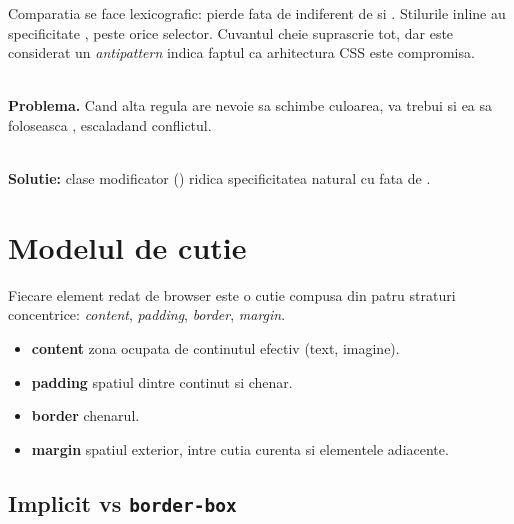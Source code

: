 Comparatia se face lexicografic:  pierde fata de  indiferent de  si . Stilurile inline au specificitate , peste orice selector. Cuvantul cheie  suprascrie tot, dar este considerat un \emph{antipattern} \textendash{} indica faptul ca arhitectura CSS este compromisa.

\begin{dano}
\\
\textbf{Problema.} Cand alta regula are nevoie sa schimbe culoarea, va trebui si ea sa foloseasca , escaladand conflictul.
\end{dano}

\begin{dado}
\\
\textbf{Solutie:} clase modificator () ridica specificitatea natural cu  fata de .
\end{dado}

\section{Modelul de cutie}

Fiecare element redat de browser este o cutie compusa din patru straturi concentrice: \emph{content}, \emph{padding}, \emph{border}, \emph{margin}.

\boxmodelfigure

\begin{itemize}
  \item \textbf{content} \textendash{} zona ocupata de continutul efectiv (text, imagine).
  \item \textbf{padding} \textendash{} spatiul dintre continut si chenar.
  \item \textbf{border} \textendash{} chenarul.
  \item \textbf{margin} \textendash{} spatiul exterior, intre cutia curenta si elementele adiacente.
\end{itemize}

\subsection{Implicit vs \texttt{border-box}}

